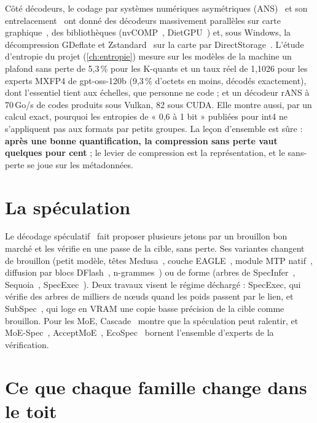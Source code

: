 Côté décodeurs, le codage par systèmes numériques asymétriques (ANS)~\cite{duda2013ans} et son entrelacement~\cite{giesen2014interleaved} ont donné des décodeurs massivement parallèles sur carte graphique~\cite{weissenberger2019multians,lin2023recoil}, des bibliothèques (nvCOMP~\cite{nvcomp2026}, DietGPU~\cite{dietgpu}) et, sous Windows, la décompression GDeflate et Zstandard~\cite{zstd} sur la carte par DirectStorage~\cite{directstorage14}. L'étude d'entropie du projet (\cref{ch:entropie}) mesure sur les modèles de la machine un plafond sans perte de 5,3\,\% pour les K-quants et un taux réel de 1,1026 pour les experts MXFP4 de gpt-oss-120b (9,3\,\% d'octets en moins, décodés exactement), dont l'essentiel tient aux échelles, que personne ne code ; et un décodeur rANS à 70\,Go/s de codes produits sous Vulkan, 82 sous CUDA. Elle montre aussi, par un calcul exact, pourquoi les entropies de « 0,6 à 1 bit » publiées pour int4 ne s'appliquent pas aux formats par petits groupes. La leçon d'ensemble est sûre : \textbf{après une bonne quantification, la compression sans perte vaut quelques pour cent} ; le levier de compression est la représentation, et le sans-perte se joue sur les métadonnées.

\section{La spéculation}\label{sec:etat-spec}

Le décodage spéculatif~\cite{leviathan2023,chen2023spec} fait proposer plusieurs jetons par un brouillon bon marché et les vérifie en une passe de la cible, sans perte. Ses variantes changent de brouillon (petit modèle, têtes Medusa~\cite{medusa2024}, couche EAGLE~\cite{eagle2_2024,eagle3_2025}, module MTP natif~\cite{gloeckle2024,deepseekv3_2024}, diffusion par blocs DFlash~\cite{dflash2026}, n-grammes~\cite{lookahead2024}) ou de forme (arbres de SpecInfer~\cite{specinfer2023}, Sequoia~\cite{sequoia2024}, SpecExec~\cite{specexec2024}). Deux travaux visent le régime déchargé : SpecExec, qui vérifie des arbres de milliers de nœuds quand les poids passent par le lien, et SubSpec~\cite{subspec2025}, qui loge en VRAM une copie basse précision de la cible comme brouillon. Pour les MoE, Cascade~\cite{cascade2025} montre que la spéculation peut ralentir, et MoE-Spec~\cite{moespec2026}, AcceptMoE~\cite{acceptmoe2026}, EcoSpec~\cite{ecospec2026} bornent l'ensemble d'experts de la vérification.

\section{Ce que chaque famille change dans le toit}\label{sec:etat-leviers}

